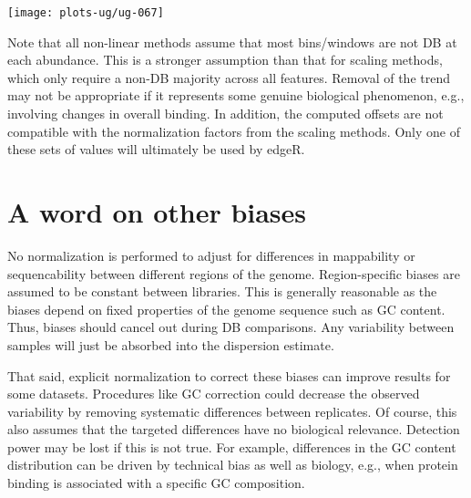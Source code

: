 \documentclass[12pt]{report}
\newcommand{\edger}{edgeR}
\begin{document}
\begin{center}
\texttt{[image: plots-ug/ug-067]}
\end{center}

Note that all non-linear methods assume that most bins/windows are not DB at each abundance. 
This is a stronger assumption than that for scaling methods, which only require a non-DB majority across all features.
Removal of the trend may not be appropriate if it represents some genuine biological phenomenon, e.g., involving changes in overall binding. 
In addition, the computed offsets are not compatible with the normalization factors from the scaling methods.
Only one of these sets of values will ultimately be used by \edger{}.


\section{A word on other biases}
No normalization is performed to adjust for differences in mappability or sequencability between different regions of the genome. 
Region-specific biases are assumed to be constant between libraries. 
This is generally reasonable as the biases depend on fixed properties of the genome sequence such as GC content. 
Thus, biases should cancel out during DB comparisons.
Any variability between samples will just be absorbed into the dispersion estimate. 

That said, explicit normalization to correct these biases can improve results for some datasets.
Procedures like GC correction could decrease the observed variability by removing systematic differences between replicates. 
Of course, this also assumes that the targeted differences have no biological relevance.
Detection power may be lost if this is not true. 
For example, differences in the GC content distribution can be driven by technical bias as well as biology, e.g., when protein binding is associated with a specific GC composition.


\end{document}
